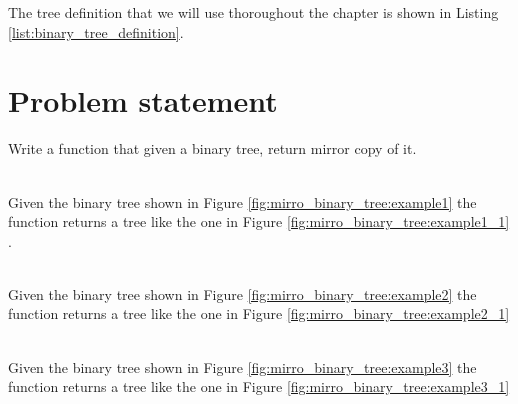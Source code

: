The tree definition that we will use thoroughout the chapter is shown in Listing \ref{list:binary_tree_definition}.


\section{Problem statement}
\begin{exercise}
	Write a function that given a binary tree, return mirror copy of it.

	\begin{example}
		\hfill \\
		Given the binary tree shown in Figure \ref{fig:mirro_binary_tree:example1} the function
		returns a tree like the one in Figure \ref{fig:mirro_binary_tree:example1_1}
		\label{ex:mirro_binary_tree:example1}.
	\end{example}

	\begin{example}
		\hfill \\
		Given the binary tree shown in Figure \ref{fig:mirro_binary_tree:example2} the function
		returns a tree like the one in Figure \ref{fig:mirro_binary_tree:example2_1}
		\label{ex:mirro_binary_tree:example2}
	\end{example}

	\begin{example}
		\hfill \\
		Given the binary tree shown in Figure \ref{fig:mirro_binary_tree:example3} the function
		returns a tree like the one in Figure \ref{fig:mirro_binary_tree:example3_1}
		\label{ex:mirro_binary_tree:example3}
	\end{example}
\end{exercise}


